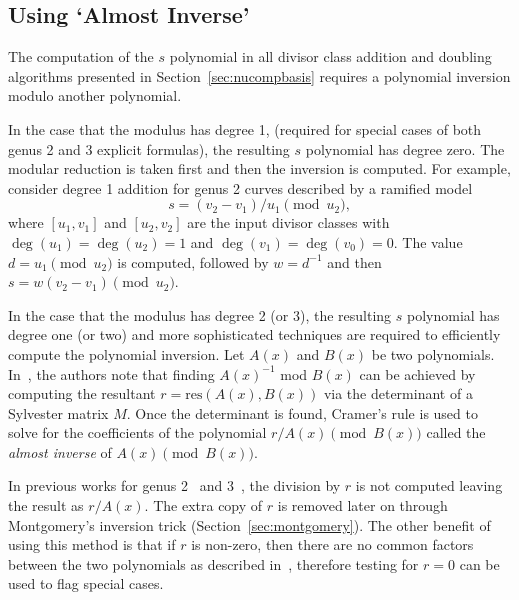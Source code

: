 \subsection{Using `Almost Inverse'}\label{sec:almostinv} 

The computation of the $s$ polynomial in all divisor class addition and
doubling algorithms presented in Section~\ref{sec:nucompbasis} requires a
polynomial inversion modulo another polynomial. 

In the case that the modulus has degree 1, (required for special cases of both
genus 2 and 3 explicit formulas),  the resulting $s$ polynomial has degree zero.
The modular reduction is taken first and then the inversion is computed. For
example, consider degree 1 addition for genus 2 curves described by a ramified model
$$s = (v_2 - v_1)/u_1 \pmod{u_2},$$ where $[u_1,v_1]$ and $[u_2,v_2]$ are the
input divisor classes with $\deg(u_1) = \deg(u_2) = 1$ and $\deg(v_1) =
\deg(v_0) = 0$. The value $d = u_1 \pmod{u_2}$ is computed, followed by $w =
d^{-1}$ and then $s = w(v_2 - v_1) \pmod{u_2}$.


In the case that the modulus has degree 2 (or 3), the resulting $s$ polynomial
has degree one (or two) and more sophisticated techniques are required to
efficiently compute the polynomial inversion. Let $A(x)$ and $B(x)$ be two
polynomials. In~\cite{MCA_2003}, the authors note that finding $ A(x)^{-1} $ mod
$B(x)$ can be achieved by computing the resultant $r = \mathrm{res}(A(x), B(x))$
via the determinant of a Sylvester matrix $M$. Once the determinant is found,
Cramer's rule is used to solve for the coefficients of the polynomial $r/A(x)
\pmod{B(x)}$ called the \emph{almost inverse} of $A(x) \pmod{B(x)}$.

In previous works for genus 2~\cite{Lange_explicit_2005} and
3~\cite{fan_g3_2006,Sutherland_g3_2019}, the division by $r$ is not computed
leaving the result as $r/A(x)$. The extra copy of $r$ is removed later on
through Montgomery's inversion trick (Section~\ref{sec:montgomery}). The other
benefit of using this method is that if $r$ is non-zero, then there are no common
factors between the two polynomials as described in~\cite{MCA_2003}, therefore
testing for $r=0$ can be used to flag special cases.


